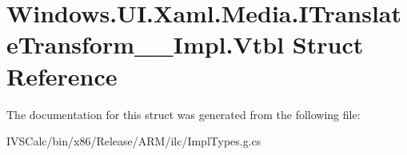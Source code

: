 \hypertarget{struct_windows_1_1_u_i_1_1_xaml_1_1_media_1_1_i_translate_transform_____impl_1_1_vtbl}{}\section{Windows.\+U\+I.\+Xaml.\+Media.\+I\+Translate\+Transform\+\_\+\+\_\+\+Impl.\+Vtbl Struct Reference}
\label{struct_windows_1_1_u_i_1_1_xaml_1_1_media_1_1_i_translate_transform_____impl_1_1_vtbl}


The documentation for this struct was generated from the following file\+:\begin{DoxyCompactItemize}
\item 
I\+V\+S\+Calc/bin/x86/\+Release/\+A\+R\+M/ilc/Impl\+Types.\+g.\+cs\end{DoxyCompactItemize}
